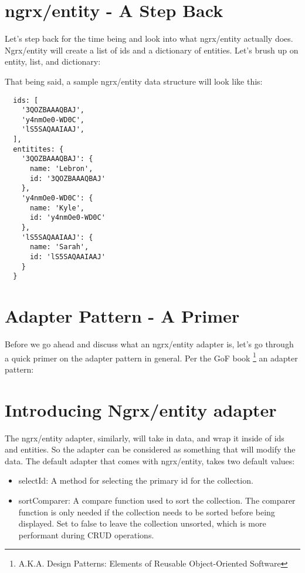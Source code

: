 \section{ ngrx/entity - A Step Back }
Let's step back for the time being and look into what ngrx/entity actually does.
Ngrx/entity will create a list of ids and a dictionary of entities. Let's brush
up on entity, list, and dictionary:

That being said, a sample ngrx/entity data structure will look like this:
\begin{lstlisting}
  ids: [
    '3QOZBAAAQBAJ',
    'y4nmOe0-WD0C',
    'lS5SAQAAIAAJ',
  ],
  entitites: {
    '3QOZBAAAQBAJ': {
      name: 'Lebron',
      id: '3QOZBAAAQBAJ'
    },
    'y4nmOe0-WD0C': {
      name: 'Kyle',
      id: 'y4nmOe0-WD0C'
    },
    'lS5SAQAAIAAJ': {
      name: 'Sarah',
      id: 'lS5SAQAAIAAJ'
    }
  }

\end{lstlisting}

\section{ Adapter Pattern - A Primer  }
Before we go ahead and discuss what an ngrx/entity adapter is, let's go through
a quick primer on the adapter pattern in general. Per the GoF book
\footnote{A.K.A. Design Patterns: Elements of Reusable Object-Oriented Software}
an adapter pattern:


\section{ Introducing Ngrx/entity adapter }
The ngrx/entity adapter, similarly, will take in data, and wrap it inside of ids
and entities. So the adapter can be considered as something that will modify
the data. The default adapter that comes with ngrx/entity, takes two default
values:
\begin{itemize}
  \item selectId: A method for selecting the primary id for the collection.
  \item sortComparer: A compare function used to sort the collection. The
  comparer function is only needed if the collection needs to be sorted before
  being displayed. Set to false to leave the collection unsorted, which is more
  performant during CRUD operations.
\end{itemize}


